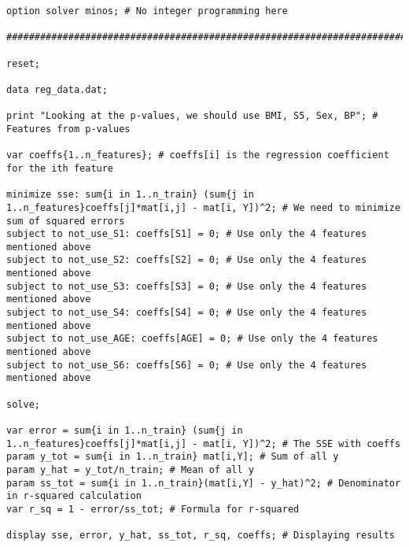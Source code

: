 \documentclass[15pt,a4paper,openright]{article}
\begin{document}
\begin{lstlisting}[language=AMPL, caption=1a Code]
option solver minos; # No integer programming here

#########################################################################

reset;

data reg_data.dat;

print "Looking at the p-values, we should use BMI, S5, Sex, BP"; # Features from p-values

var coeffs{1..n_features}; # coeffs[i] is the regression coefficient for the ith feature

minimize sse: sum{i in 1..n_train} (sum{j in 1..n_features}coeffs[j]*mat[i,j] - mat[i, Y])^2; # We need to minimize sum of squared errors
subject to not_use_S1: coeffs[S1] = 0; # Use only the 4 features mentioned above
subject to not_use_S2: coeffs[S2] = 0; # Use only the 4 features mentioned above
subject to not_use_S3: coeffs[S3] = 0; # Use only the 4 features mentioned above
subject to not_use_S4: coeffs[S4] = 0; # Use only the 4 features mentioned above
subject to not_use_AGE: coeffs[AGE] = 0; # Use only the 4 features mentioned above
subject to not_use_S6: coeffs[S6] = 0; # Use only the 4 features mentioned above

solve;

var error = sum{i in 1..n_train} (sum{j in 1..n_features}coeffs[j]*mat[i,j] - mat[i, Y])^2; # The SSE with coeffs
param y_tot = sum{i in 1..n_train} mat[i,Y]; # Sum of all y
param y_hat = y_tot/n_train; # Mean of all y
param ss_tot = sum{i in 1..n_train}(mat[i,Y] - y_hat)^2; # Denominator in r-squared calculation
var r_sq = 1 - error/ss_tot; # Formula for r-squared

display sse, error, y_hat, ss_tot, r_sq, coeffs; # Displaying results

\end{lstlisting}
\end{document}
